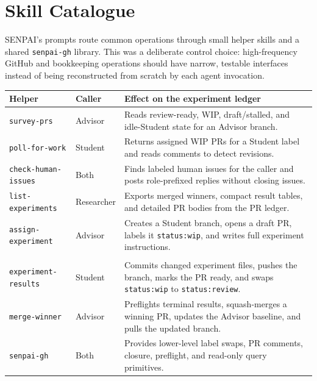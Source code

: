 \documentclass{article}
\begin{document}
\section{Skill Catalogue}
\label{app:skill-catalogue}

SENPAI's prompts route common operations through small helper skills and a shared \texttt{senpai-gh} library. This was a deliberate control choice: high-frequency GitHub and bookkeeping operations should have narrow, testable interfaces instead of being reconstructed from scratch by each agent invocation.

\begin{center}
  \label{tab:skill-catalogue}
  \small
  \begin{tabular}{@{}p{}p{}p{}@{}}
    \toprule
    Helper & Caller & Effect on the experiment ledger \\
    \midrule
    \texttt{survey-prs} & Advisor & Reads review-ready, WIP, draft/stalled, and idle-Student state for an Advisor branch. \\
    \texttt{poll-for-work} & Student & Returns assigned WIP PRs for a Student label and reads comments to detect revisions. \\
    \texttt{check-human-issues} & Both & Finds labeled human issues for the caller and posts role-prefixed replies without closing issues. \\
    \texttt{list-experiments} & Researcher & Exports merged winners, compact result tables, and detailed PR bodies from the PR ledger. \\
    \texttt{assign-experiment} & Advisor & Creates a Student branch, opens a draft PR, labels it \texttt{status:wip}, and writes full experiment instructions. \\
    \shortstack[l]{\texttt{submit-}\\\texttt{experiment-results}} & Student & Commits changed experiment files, pushes the branch, marks the PR ready, and swaps \texttt{status:wip} to \texttt{status:review}. \\
    \texttt{merge-winner} & Advisor & Preflights terminal results, squash-merges a winning PR, updates the Advisor baseline, and pulls the updated branch. \\
    \texttt{senpai-gh} & Both & Provides lower-level label swaps, PR comments, closure, preflight, and read-only query primitives. \\
    \bottomrule
  \end{tabular}
\end{center}
\end{document}
